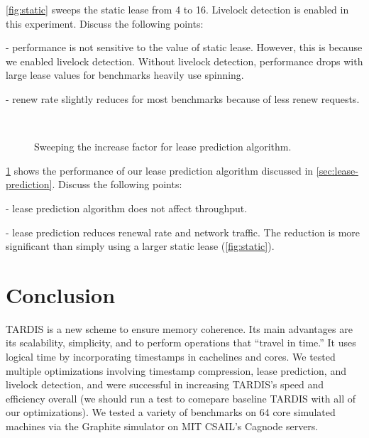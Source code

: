 \documentclass[12pt]{article}
\begin{document}
\cref{fig:static} sweeps the static lease from 4 to 16. Livelock 
detection is enabled in this experiment. Discuss the following points:

- performance is not sensitive to the value of static lease. However, 
  this is because we enabled livelock detection. Without livelock 
  detection, performance drops with large lease values for benchmarks 
  heavily use spinning.

- renew rate slightly reduces for most benchmarks because of less 
  renew requests.

\begin{figure}
	\centering
	\\
	\caption{ Sweeping the increase factor for lease prediction 
	algorithm.}
	\label{fig:exp}
\end{figure}

\cref{fig:exp} shows the performance of our lease prediction algorithm 
discussed in \cref{sec:lease-prediction}. Discuss the following 
points:

- lease prediction algorithm does not affect throughput.

- lease prediction reduces renewal rate and network traffic. The 
  reduction is more significant than simply using a larger static 
  lease (\cref{fig:static}).



\section{Conclusion}
	TARDIS is a new scheme to ensure memory coherence. Its main advantages are its scalability, simplicity, and to perform operations that “travel in time.” It uses logical time by incorporating timestamps in cachelines and cores. We tested multiple optimizations involving timestamp compression, lease prediction, and livelock detection, and were successful in increasing TARDIS’s speed and efficiency overall (we should run a test to comepare baseline TARDIS with all of our optimizations). We tested a variety of benchmarks on 64 core simulated machines via the Graphite simulator on MIT CSAIL’s Cagnode servers.

{
	
	
}
\end{document}
